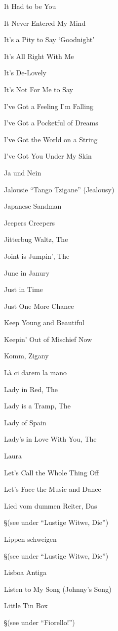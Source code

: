 \N It Had to be You


\N It Never Entered My Mind


\N It's a Pity to Say `Goodnight'


\N It's All Right With Me


\N It's De-Lovely


\N It's Not For Me to Say


\N I've Got a Feeling I'm Falling


\N I've Got a Pocketful of Dreams


\N I've Got the World on a String


\N I've Got You Under My Skin


\N Ja und Nein


\N Jalousie ``Tango Tzigane'' (Jealousy)


\N Japanese Sandman


\N Jeepers Creepers


\N Jitterbug Waltz, The


\N Joint is Jumpin', The


\N June in Janury


\N Just in Time


\N Just One More Chance


\N Keep Young and Beautiful


\N Keepin' Out of Mischief Now


\N Komm, Zigany


\N L{\`a} ci darem la mano


\N Lady in Red, The


\N Lady is a Tramp, The


\N Lady of Spain


\N Lady's in Love With You, The


\N Laura


\N Let's Call the Whole Thing Off


\N Let's Face the Music and Dance


\N Lied vom dummen Reiter, Das

\nobreak
\S (see under ``Lustige Witwe, Die'')

\N Lippen schweigen

\nobreak
\S (see under ``Lustige Witwe, Die'')

\N Lisboa Antiga


\N Listen to My Song (Johnny's Song)


\N Little Tin Box

\nobreak
\S (see under ``Fiorello!'')

